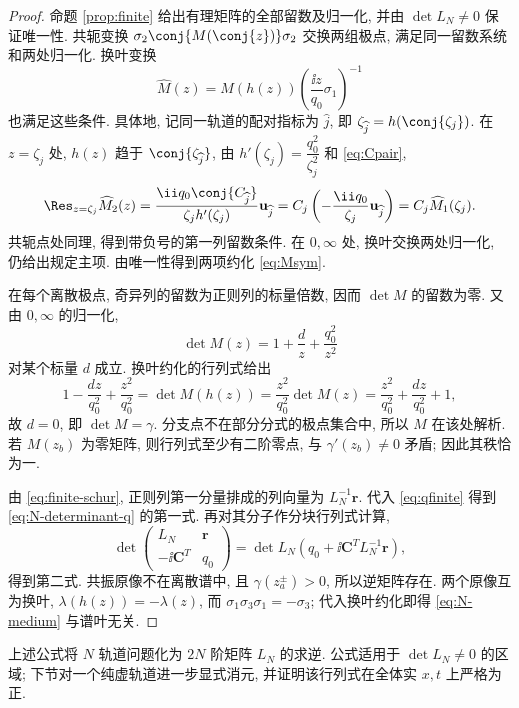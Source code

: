 \begin{proof}
命题 \ref{prop:finite} 给出有理矩阵的全部留数及归一化, 并由 $\det L_N\ne0$ 保证唯一性. 共轭变换 $\sigma_2\conj{M(\conj{z})}\sigma_2$ 交换两组极点, 满足同一留数系统和两处归一化. 换叶变换
\[
\widehat M(z)=M(h(z))\left(\dfrac{\ii z}{q_0}\sigma_1\right)^{-1}
\]
也满足这些条件. 具体地, 记同一轨道的配对指标为 $\widehat j$, 即 $\zeta_{\widehat j}=h(\conj{\zeta_j})$. 在 $z=\zeta_j$ 处, $h(z)$ 趋于 $\conj{\zeta_{\widehat j}}$, 由 $h'(\zeta_j)=\dfrac{q_0^2}{\zeta_j^2}$ 和 \eqref{eq:Cpair},
\[
\Res_{z=\zeta_j}\widehat M_2(z)
=\dfrac{\ii q_0\conj{C_{\widehat j}}}{\zeta_jh'(\zeta_j)}\mathbf u_{\widehat j}
=C_j\left(-\dfrac{\ii q_0}{\zeta_j}\mathbf u_{\widehat j}\right)
=C_j\widehat M_1(\zeta_j).
\]
共轭点处同理, 得到带负号的第一列留数条件. 在 $0,\infty$ 处, 换叶交换两处归一化, 仍给出规定主项. 由唯一性得到两项约化 \eqref{eq:Msym}.

在每个离散极点, 奇异列的留数为正则列的标量倍数, 因而 $\det M$ 的留数为零. 又由 $0,\infty$ 的归一化,
\[
\det M(z)=1+\dfrac{d}{z}+\dfrac{q_0^2}{z^2}
\]
对某个标量 $d$ 成立. 换叶约化的行列式给出
\[
1-\dfrac{dz}{q_0^2}+\dfrac{z^2}{q_0^2}
=\det M(h(z))=\dfrac{z^2}{q_0^2}\det M(z)
=\dfrac{z^2}{q_0^2}+\dfrac{dz}{q_0^2}+1,
\]
故 $d=0$, 即 $\det M=\gamma$. 分支点不在部分分式的极点集合中, 所以 $M$ 在该处解析. 若 $M(z_b)$ 为零矩阵, 则行列式至少有二阶零点, 与 $\gamma'(z_b)\ne0$ 矛盾; 因此其秩恰为一.

由 \eqref{eq:finite-schur}, 正则列第一分量排成的列向量为 $L_N^{-1}\boldsymbol r$. 代入 \eqref{eq:qfinite} 得到 \eqref{eq:N-determinant-q} 的第一式. 再对其分子作分块行列式计算,
\[
\det\begin{pmatrix}L_N&\boldsymbol r\\-\ii\boldsymbol C^T&q_0\end{pmatrix}
=\det L_N\left(q_0+\ii\boldsymbol C^T L_N^{-1}\boldsymbol r\right),
\]
得到第二式. 共振原像不在离散谱中, 且 $\gamma(z_a^\pm)>0$, 所以逆矩阵存在. 两个原像互为换叶, $\lambda(h(z))=-\lambda(z)$, 而 $\sigma_1\sigma_3\sigma_1=-\sigma_3$; 代入换叶约化即得 \eqref{eq:N-medium} 与谱叶无关.
\end{proof}

上述公式将 $N$ 轨道问题化为 $2N$ 阶矩阵 $L_N$ 的求逆. 公式适用于 $\det L_N\ne0$ 的区域; 下节对一个纯虚轨道进一步显式消元, 并证明该行列式在全体实 $x,t$ 上严格为正.

